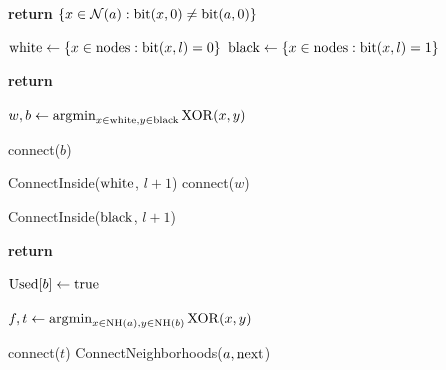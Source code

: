 \documentclass[conference]{IEEEtran}
\theoremstyle{definition}
\DeclareMathOperator*{\argmin}{\arg\!\min}
\newcommand{\cN}{{\mathcal{N}}}
\begin{document}
\begin{algorithm}
    \begin{algorithmic}[1]

           
            \State \textbf{return} $ \{x \in \cN(a): {\rm bit}(x, 0) 
            		\ne {\rm bit}(a, 0)\} $
        \EndFunction

    \end{algorithmic}
\end{algorithm}

\begin{algorithm}
    \begin{algorithmic}[1]

            \State ${\rm white} \gets \{x \in {\rm nodes}: {\rm bit}(x, l) = 0\}$
            \State ${\rm black} \gets \{x \in {\rm nodes}: {\rm bit}(x, l) = 1\}$
            
                \State \textbf{return}
            \EndIf

            \State $w,b \gets \argmin_{x \in {\rm white}, y \in {\rm black}}{\rm XOR}(x, y)$

                    \State connect($b$)
                \EndIf
                
                \State ConnectInside(${\rm white}$, $l + 1$)
            \Else
                    \State connect($w$)
                \EndIf

                \State ConnectInside(${\rm black}$, $l + 1$)
            \EndIf
        \EndProcedure
        
    \end{algorithmic}
\end{algorithm}

\begin{algorithm}
    \begin{algorithmic}[1]
        
                \State \textbf{return}      %
            \EndIf
                
            \State ${\rm Used}[b] \gets {\rm true}$

                \State $f, t \gets \argmin_{x \in {\rm NH}(a), y \in {\rm NH}(b)}{\rm XOR}(x, y)$

                    \State connect($t$)
                \EndIf
            \Else
                \For {${\rm next} \in \cN(b) \setminus {\rm NH}(b)$}
                    \State ConnectNeighborhoods($a, {\rm next}$)
                \EndFor
            \EndIf

        \EndProcedure
    \end{algorithmic}
\end{algorithm}
\end{document}
